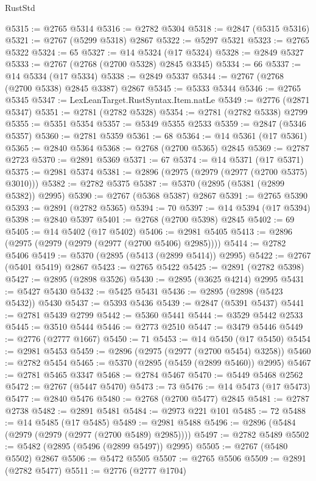 \begin{lexlean}{RustStd}
\begin{coremodule}
@5315 := @2765 @5314
@5316 := @2782 @5304
@5318 := @2847 (@5315 @5316)
@5321 := @2767 (@5299 @5318) @2867
@5322 := @5297 @5321
@5323 := @2765 @5322
@5324 := 65
@5327 := @14 @5324 (@17 @5324)
@5328 := @2849 @5327
@5333 := @2767 (@2768 (@2700 @5328) @2845 @3345)
@5334 := 66
@5337 := @14 @5334 (@17 @5334)
@5338 := @2849 @5337
@5344 := @2767 (@2768 (@2700 @5338) @2845 @3387) @2867
@5345 := @5333 @5344
@5346 := @2765 @5345
@5347 := LexLeanTarget.RustSyntax.Item.natLe
@5349 := @2776 (@2871 @5347)
@5351 := @2781 (@2782 @5328)
@5354 := @2781 (@2782 @5338) @2799
@5355 := @5351 @5354
@5357 := @5349 @5355 @2533
@5359 := @2847 (@5346 @5357)
@5360 := @2781 @5359
@5361 := 68
@5364 := @14 @5361 (@17 @5361)
@5365 := @2840 @5364
@5368 := @2768 (@2700 @5365) @2845
@5369 := @2787 @2723
@5370 := @2891 @5369
@5371 := 67
@5374 := @14 @5371 (@17 @5371)
@5375 := @2981 @5374
@5381 := @2896 (@2975 (@2979 (@2977 (@2700 @5375) @3010)))
@5382 := @2782 @5375
@5387 := @5370 (@2895 (@5381 (@2899 @5382)) @2995)
@5390 := @2767 (@5368 @5387) @2867
@5391 := @2765 @5390
@5393 := @2891 (@2782 @5365)
@5394 := 70
@5397 := @14 @5394 (@17 @5394)
@5398 := @2840 @5397
@5401 := @2768 (@2700 @5398) @2845
@5402 := 69
@5405 := @14 @5402 (@17 @5402)
@5406 := @2981 @5405
@5413 := @2896 (@2975 (@2979 (@2979 (@2977 (@2700 @5406) @2985))))
@5414 := @2782 @5406
@5419 := @5370 (@2895 (@5413 (@2899 @5414)) @2995)
@5422 := @2767 (@5401 @5419) @2867
@5423 := @2765 @5422
@5425 := @2891 (@2782 @5398)
@5427 := @2895 (@2898 @3526)
@5430 := @2895 (@3625 @4214) @2995
@5431 := @5427 @5430
@5432 := @5425 @5431
@5436 := @2895 (@2898 (@5423 @5432)) @5430
@5437 := @5393 @5436
@5439 := @2847 (@5391 @5437)
@5441 := @2781 @5439 @2799
@5442 := @5360 @5441
@5444 := @3529 @5442 @2533
@5445 := @3510 @5444
@5446 := @2773 @2510
@5447 := @3479 @5446
@5449 := @2776 (@2777 @1667)
@5450 := 71
@5453 := @14 @5450 (@17 @5450)
@5454 := @2981 @5453
@5459 := @2896 (@2975 (@2977 (@2700 @5454) @3258))
@5460 := @2782 @5454
@5465 := @5370 (@2895 (@5459 (@2899 @5460)) @2995)
@5467 := @2781 @5465 @3347
@5468 := @2784 @5467
@5470 := @5449 @5468 @2562
@5472 := @2767 (@5447 @5470)
@5473 := 73
@5476 := @14 @5473 (@17 @5473)
@5477 := @2840 @5476
@5480 := @2768 (@2700 @5477) @2845
@5481 := @2787 @2738
@5482 := @2891 @5481
@5484 := @2973 @221 @101
@5485 := 72
@5488 := @14 @5485 (@17 @5485)
@5489 := @2981 @5488
@5496 := @2896 (@5484 (@2979 (@2979 (@2977 (@2700 @5489) @2985))))
@5497 := @2782 @5489
@5502 := @5482 (@2895 (@5496 (@2899 @5497)) @2995)
@5505 := @2767 (@5480 @5502) @2867
@5506 := @5472 @5505
@5507 := @2765 @5506
@5509 := @2891 (@2782 @5477)
@5511 := @2776 (@2777 @1704)

\end{coremodule}
\end{lexlean}
